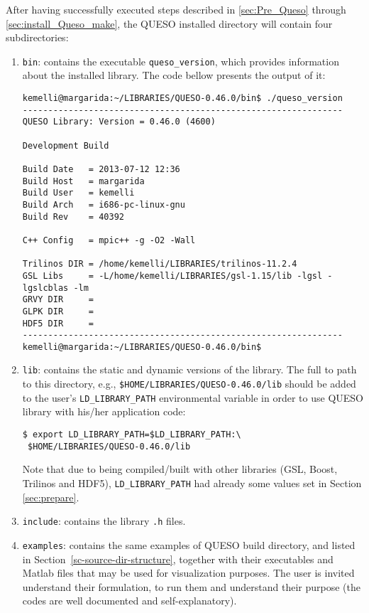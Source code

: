 After having successfully executed steps described in \textsection{}\ref{sec:Pre_Queso} through \textsection{}\ref{sec:install_Queso_make}, the QUESO installed directory will contain four subdirectories:
\begin{enumerate}
 \item \verb+bin+: contains the executable \verb+queso_version+, which provides information about the installed library. The code bellow presents the output of it:

\begin{lstlisting}[label={},caption={}]
kemelli@margarida:~/LIBRARIES/QUESO-0.46.0/bin$ ./queso_version 
---------------------------------------------------------------
QUESO Library: Version = 0.46.0 (4600)

Development Build

Build Date   = 2013-07-12 12:36
Build Host   = margarida
Build User   = kemelli
Build Arch   = i686-pc-linux-gnu
Build Rev    = 40392

C++ Config   = mpic++ -g -O2 -Wall

Trilinos DIR = /home/kemelli/LIBRARIES/trilinos-11.2.4
GSL Libs     = -L/home/kemelli/LIBRARIES/gsl-1.15/lib -lgsl -lgslcblas -lm
GRVY DIR     = 
GLPK DIR     = 
HDF5 DIR     = 
---------------------------------------------------------------
kemelli@margarida:~/LIBRARIES/QUESO-0.46.0/bin$ 
\end{lstlisting}

 \item \verb+lib+: contains the static and dynamic versions of the library. The full to path to this directory, e.g., \verb+$HOME/LIBRARIES/QUESO-0.46.0/lib+ should be added to the user's \verb+LD_LIBRARY_PATH+ environmental variable in order to use QUESO library with his/her application code:
\begin{lstlisting}[label={},caption={}]
$ export LD_LIBRARY_PATH=$LD_LIBRARY_PATH:\
 $HOME/LIBRARIES/QUESO-0.46.0/lib
\end{lstlisting}


Note that due to \Queso{} being compiled/built with other libraries (GSL, Boost, Trilinos and HDF5), \verb+LD_LIBRARY_PATH+ had already some values set in Section \ref{sec:prepare}.


 \item \verb+include+: contains the library \verb+.h+ files.

 \item \verb+examples+: contains the same examples of QUESO build directory, and listed in Section~\ref{sc-source-dir-structure}, together with their executables and Matlab files that may be used for visualization purposes. The user is invited understand their formulation, to run them and understand their purpose (the codes are well documented and self-explanatory). 


\end{enumerate}


